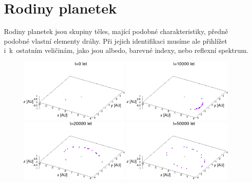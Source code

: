 \documentclass[A4paper, 12pt, oneside, openany]{book}
\begin{document}
\pagebreak
\section{Rodiny planetek}

Rodiny planetek jsou skupiny těles, mající podobné charakteristiky, předně podobné vlastní elementy dráhy. Při jejich identifikaci musíme ale přihlížet i~k~ostatním veličinám, jako jsou albedo, barevné indexy, nebo reflexní spektrum.

\immediate{}
\immediate{}
\immediate{}
\immediate{}
\begin{figure}
	\centering
	\includegraphics[width=0.49\textwidth]{obr/trajec_001t.png}
	\includegraphics[width=0.49\textwidth]{obr/trajec_101t.png} \\
	\includegraphics[width=0.49\textwidth]{obr/trajec_201t.png}
	\includegraphics[width=0.49\textwidth]{obr/trajec_501t.png}

\end{figure}
\end{document}
